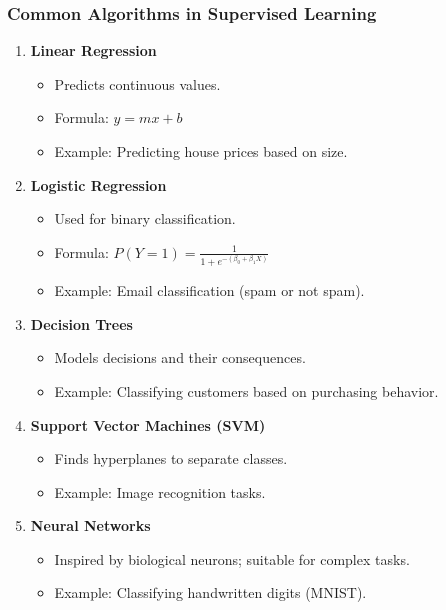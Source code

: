 \documentclass[aspectratio=169]{beamer}
\begin{document}
\begin{frame}[fragile]
    \frametitle{Common Algorithms in Supervised Learning}
    
    \begin{enumerate}
        \item \textbf{Linear Regression}
            \begin{itemize}
                \item Predicts continuous values.
                \item Formula: \( y = mx + b \)
                \item Example: Predicting house prices based on size.
            \end{itemize}
        
        \item \textbf{Logistic Regression}
            \begin{itemize}
                \item Used for binary classification.
                \item Formula: \( P(Y=1) = \frac{1}{1 + e^{-(\beta_0 + \beta_1X)}} \)
                \item Example: Email classification (spam or not spam).
            \end{itemize}
        
        \item \textbf{Decision Trees}
            \begin{itemize}
                \item Models decisions and their consequences.
                \item Example: Classifying customers based on purchasing behavior.
            \end{itemize}
        
        \item \textbf{Support Vector Machines (SVM)}
            \begin{itemize}
                \item Finds hyperplanes to separate classes.
                \item Example: Image recognition tasks.
            \end{itemize}
        
        \item \textbf{Neural Networks}
            \begin{itemize}
                \item Inspired by biological neurons; suitable for complex tasks.
                \item Example: Classifying handwritten digits (MNIST).
            \end{itemize}
    \end{enumerate}
\end{frame}
\end{document}
